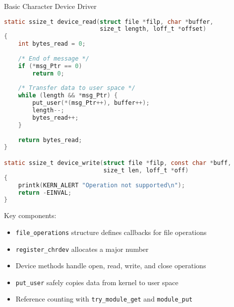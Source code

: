 \begin{code}{Basic Character Device Driver}
\begin{lstlisting}[language=C, style=basesmol]
static ssize_t device_read(struct file *filp, char *buffer, 
                           size_t length, loff_t *offset)
{
    int bytes_read = 0;
    
    /* End of message */
    if (*msg_Ptr == 0)
        return 0;
        
    /* Transfer data to user space */
    while (length && *msg_Ptr) {
        put_user(*(msg_Ptr++), buffer++);
        length--;
        bytes_read++;
    }
    
    return bytes_read;
}

static ssize_t device_write(struct file *filp, const char *buff, 
                            size_t len, loff_t *off)
{
    printk(KERN_ALERT "Operation not supported\n");
    return -EINVAL;
}
\end{lstlisting}

    Key components:
    \begin{itemize}
        \item \texttt{file\_operations} structure defines callbacks for file operations
        \item \texttt{register\_chrdev} allocates a major number
        \item Device methods handle open, read, write, and close operations
        \item \texttt{put\_user} safely copies data from kernel to user space
        \item Reference counting with \texttt{try\_module\_get} and \texttt{module\_put}
    \end{itemize}
\end{code}

